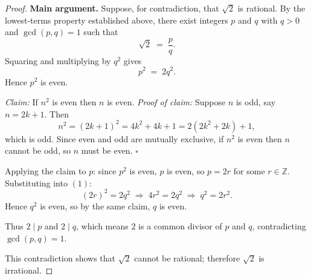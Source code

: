 \begin{proof}
\medskip
\noindent\textbf{Main argument.}
Suppose, for contradiction, that $\sqrt{2}$ is rational. By the lowest-terms property established above, there exist integers $p$ and $q$ with $q>0$ and $\gcd(p,q)=1$ such that
\[
\sqrt{2} \;=\; \frac{p}{q}.
\]
Squaring and multiplying by $q^2$ gives
\[
p^2 \;=\; 2q^2. \tag{1}
\]
Hence $p^2$ is even.

\emph{Claim:} If $n^2$ is even then $n$ is even. \emph{Proof of claim:} Suppose $n$ is odd, say $n=2k+1$. Then
\[
n^2 = (2k+1)^2 = 4k^2+4k+1 = 2(2k^2+2k)+1,
\]
which is odd. Since even and odd are mutually exclusive, if $n^2$ is even then $n$ cannot be odd, so $n$ must be even. $\square$

Applying the claim to $p$: since $p^2$ is even, $p$ is even, so $p=2r$ for some $r\in\mathbb{Z}$. Substituting into $(1)$:
\[
(2r)^2 = 2q^2 \;\Longrightarrow\; 4r^2 = 2q^2 \;\Longrightarrow\; q^2 = 2r^2.
\]
Hence $q^2$ is even, so by the same claim, $q$ is even.

Thus $2\mid p$ and $2\mid q$, which means $2$ is a common divisor of $p$ and $q$, contradicting $\gcd(p,q)=1$.

This contradiction shows that $\sqrt{2}$ cannot be rational; therefore $\sqrt{2}$ is irrational.
\end{proof}
